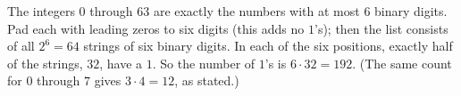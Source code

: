 The integers $0$ through $63$ are exactly the numbers with at most $6$ binary digits. Pad each with leading zeros to six digits (this adds no $1$'s); then the list consists of all $2^6=64$ strings of six binary digits. In each of the six positions, exactly half of the strings, $32$, have a $1$. So the number of $1$'s is $6\cdot32=\boxed{192}$. (The same count for $0$ through $7$ gives $3\cdot4=12$, as stated.)
